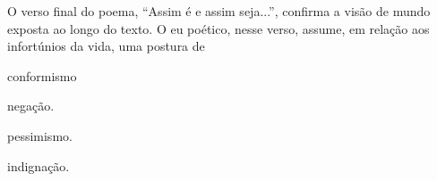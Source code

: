 O verso final do poema, ``Assim é e assim seja...'', confirma a visão de
mundo exposta ao longo do texto. O eu poético, nesse verso, assume, em
relação aos infortúnios da vida, uma postura de

\begin{escolha}
\item conformismo

\item negação.

\item pessimismo.

\item indignação.
\end{escolha}